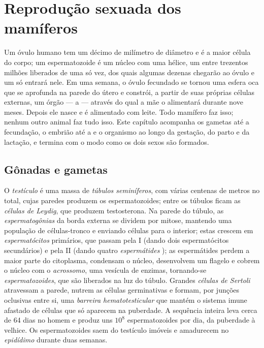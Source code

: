 \chapter{Reprodução sexuada dos mamíferos}\label{ch:b2:mammal-reproduction}

Um óvulo humano tem um décimo de milímetro de diâmetro e é a maior
célula do corpo; um espermatozoide é um núcleo com uma hélice, um entre
trezentos milhões liberados de uma só vez, dos quais algumas dezenas
chegarão ao óvulo e um só entrará nele. Em uma semana, o óvulo
fecundado se tornou uma esfera oca que se aprofunda na parede do útero
e constrói, a partir de suas próprias células externas, um órgão --- a
 --- através do qual a mãe o alimentará durante nove meses.
Depois ele nasce e é alimentado com leite. Todo mamífero faz isso;
nenhum outro animal faz tudo isso. Este capítulo acompanha os gametas
até a fecundação, o embrião até a  e o organismo ao longo da
gestação, do parto e da lactação, e termina com o modo como os dois
sexos são formados.

\section{Gônadas e gametas}

\begin{definition}\label{def:b2:mammal-reproduction:testis}
O \emph{testículo} é uma massa de \emph{túbulos seminíferos}, com
várias centenas de metros no total, cujas paredes produzem os
espermatozoides; entre os túbulos ficam as \emph{células de Leydig},
que produzem testosterona. Na parede do túbulo, as
\emph{espermatogônias} da borda externa se dividem por mitose,
mantendo uma população de células-tronco e enviando células para o
interior; estas crescem em \emph{espermatócitos} primários, que passam
pela  I (dando dois espermatócitos secundários) e pela  II
(dando quatro \emph{espermátides} ); as espermátides perdem a
maior parte do citoplasma, condensam o núcleo, desenvolvem um flagelo
e cobrem o núcleo com o \emph{acrossomo}, uma vesícula de enzimas,
tornando-se \emph{espermatozoides}, que são liberados na luz do túbulo.
Grandes \emph{células de Sertoli} atravessam a parede, nutrem as
células germinativas e formam, por junções oclusivas entre si, uma
\emph{barreira hematotesticular} que mantém o sistema imune afastado
de células que só aparecem na puberdade. A sequência inteira leva
cerca de \num{64} dias no homem e produz uns $10^{8}$ espermatozoides
por dia, da puberdade à velhice. Os espermatozoides saem do testículo
imóveis e amadurecem no \emph{epidídimo} durante duas semanas.
\end{definition}

